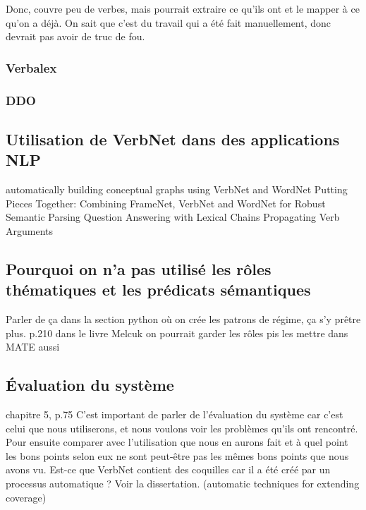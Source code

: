 Donc, couvre peu de verbes, mais pourrait extraire ce qu'ils ont et le mapper à ce qu'on a déjà. On sait que c'est du travail qui a été fait manuellement, donc devrait pas avoir de truc de fou.


\subsubsection{Verbalex}

\subsubsection{DDO}

\subsection {Utilisation de VerbNet dans des applications NLP}

automatically building conceptual graphs using VerbNet and WordNet
Putting Pieces Together: Combining FrameNet, VerbNet and WordNet for Robust Semantic Parsing
Question Answering with Lexical Chains Propagating Verb Arguments


\subsection{Pourquoi on n'a pas utilisé les rôles thématiques et les prédicats sémantiques}

Parler de ça dans la section python où on crée les patrons de régime, ça s'y prêtre plus.
p.210 dans le livre Melcuk
on pourrait garder les rôles pis les mettre dans MATE aussi

\subsection{Évaluation du système}
chapitre 5, p.75 C'est important de parler de l'évaluation du système car c'est celui que nous utiliserons, et nous voulons voir les problèmes qu'ils ont rencontré. Pour ensuite comparer avec l'utilisation que nous en aurons fait et à quel point les bons points selon eux ne sont peut-être pas les mêmes bons points que nous avons vu. Est-ce que VerbNet contient des coquilles car il a été créé par un processus automatique ? Voir la dissertation. (automatic techniques for extending coverage)

